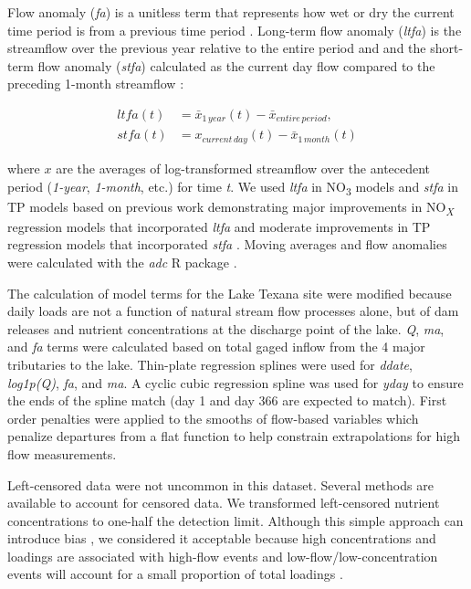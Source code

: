 \documentclass[fleqn,10pt,lineno]{wlpeerj} %
\begin{document}
Flow anomaly (\emph{fa}) is a unitless term that represents how wet or
dry the current time period is from a previous time period
\autocite{vecchiaTrendsConcentrationsUse2009,zhang_improving_2017}.
Long-term flow anomaly (\emph{ltfa}) is the streamflow over the previous
year relative to the entire period
\autocite[Eq.~\ref{eq3},][]{zhang_improving_2017} and and the short-term
flow anomaly (\emph{stfa}) calculated as the current day flow compared
to the preceding 1-month streamflow
\autocite[Eq.~\ref{eq4},][]{zhang_improving_2017}:

\begin{align}
ltfa(t) &= \bar{x}_{1\,year}(t) - \bar{x}_{entire\,period}, \label{eq3}\\
stfa(t) &= x_{current\,day}(t) - \bar{x}_{1\,month}(t) \label{eq4}
\end{align}

where \(x\) are the averages of log-transformed streamflow over the
antecedent period (\emph{1-year}, \emph{1-month}, etc.) for time
\emph{t}. We used \emph{ltfa} in NO\textsubscript{3} models and
\emph{stfa} in TP models based on previous work demonstrating major
improvements in NO\textsubscript{\emph{X}} regression models that
incorporated \emph{ltfa} and moderate improvements in TP regression
models that incorporated \emph{stfa} \autocite{zhang_improving_2017}.
Moving averages and flow anomalies were calculated with the \emph{adc} R
package \autocite{schrammAdcCalculateAntecedant2023}.

The calculation of model terms for the Lake Texana site were modified
because daily loads are not a function of natural stream flow processes
alone, but of dam releases and nutrient concentrations at the discharge
point of the lake. \emph{Q}, \emph{ma}, and \emph{fa} terms were
calculated based on total gaged inflow from the 4 major tributaries to
the lake. Thin-plate regression splines were used for \emph{ddate},
\emph{log1p(Q)}, \emph{fa}, and \emph{ma}. A cyclic cubic regression
spline was used for \emph{yday} to ensure the ends of the spline match
(day 1 and day 366 are expected to match). First order penalties were
applied to the smooths of flow-based variables which penalize departures
from a flat function to help constrain extrapolations for high flow
measurements.

Left-censored data were not uncommon in this dataset. Several methods
are available to account for censored data. We transformed left-censored
nutrient concentrations to one-half the detection limit. Although this
simple approach can introduce bias
\autocite{hornungEstimationAverageConcentration1990}, we considered it
acceptable because high concentrations and loadings are associated with
high-flow events and low-flow/low-concentration events will account for
a small proportion of total loadings
\autocite{mcdowell_implications_2021}.
\end{document}
